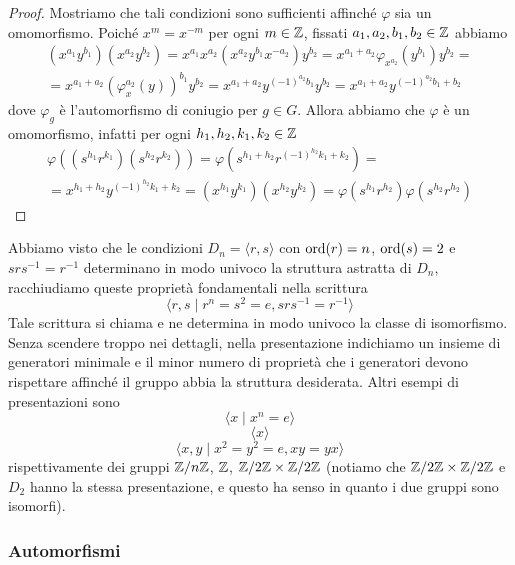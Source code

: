 \documentclass[11pt]{scrartcl}
\begin{document}
\begin{proof}
    Mostriamo che tali condizioni sono sufficienti affinché $\varphi$ sia un 
    omomorfismo. Poiché $x^m = x^{-m}$ per ogni $m \in \mathbb Z$, fissati 
    $a_1, a_2, b_1, b_2 \in \mathbb Z$ abbiamo 
    \begin{multline*}
        (x^{a_1}y^{b_1})(x^{a_2}y^{b_2}) = x^{a_1}x^{a_2}(x^{a_2}y^{b_1}x^{-a_2})y^{b_2} = 
        x^{a_1 + a_2}\varphi_{x^{a_2}}(y^{b_1})y^{b_2} = \\
        = x^{a_1 + a_2} (\varphi_x^{a_2}(y))^{b_1}y^{b_2} =
        x^{a_1 + a_2}y^{(-1)^{a_2}b_1}y^{b_2} = x^{a_1 + a_2}y^{(-1)^{a_2}b_1 + b_2}
    \end{multline*}dove $\varphi_g$ è l'automorfismo di coniugio per $g \in G$.
    Allora abbiamo che $\varphi$ è un omomorfismo, infatti per ogni $h_1, h_2, k_1, k_2 \in \mathbb Z$
    \begin{multline*}
        \varphi((s^{h_1}r^{k_1})(s^{h_2}r^{k_2})) = \varphi(s^{h_1 + h_2}r^{(-1)^{h_2}k_1 + k_2}) =\\
        = x^{h_1 + h_2}y^{(-1)^{h_2}k_1 + k_2} = (x^{h_1}y^{k_1})(x^{h_2}y^{k_2}) = 
        \varphi(s^{h_1}r^{h_2})\varphi(s^{h_2}r^{h_2})
    \end{multline*}
\end{proof}

\begin{remark}
    Abbiamo visto che le condizioni $D_n = \langle r, s\rangle$ con $\operatorname{ord}(r) = n$,
    $\operatorname{ord}(s) = 2$ e $srs^{-1} = r^{-1}$ determinano in modo univoco 
    la struttura astratta di $D_n$, racchiudiamo queste proprietà fondamentali
    nella scrittura
    \[
        \langle r, s\mid r^n = s^2 = e, srs^{-1} = r^{-1}\rangle
    \]
    Tale scrittura si chiama  e ne determina 
    in modo univoco la classe di isomorfismo. Senza scendere troppo nei dettagli,
    nella presentazione indichiamo un insieme di generatori minimale e il 
    minor numero di proprietà che i generatori devono rispettare affinché il 
    gruppo abbia la struttura desiderata. Altri esempi di presentazioni sono
    \[
        \langle x \mid x^n = e\rangle
    \]
    \[
        \langle x\rangle
    \]
    \[
        \langle x, y \mid x^2 = y^2 = e, xy = yx\rangle
    \]
    rispettivamente dei gruppi ${\mathbb Z}/n{\mathbb Z}$, $\mathbb Z$, $\mathbb{Z}/{2}\mathbb{Z}\times\mathbb{Z}/{2}\mathbb{Z}$
    (notiamo che $\mathbb{Z}/{2}\mathbb{Z}\times\mathbb{Z}/{2}\mathbb{Z}$ e $D_2$ hanno la stessa presentazione,
    e questo ha senso in quanto i due gruppi sono isomorfi).
\end{remark}


\subsubsection{Automorfismi}
\end{document}
